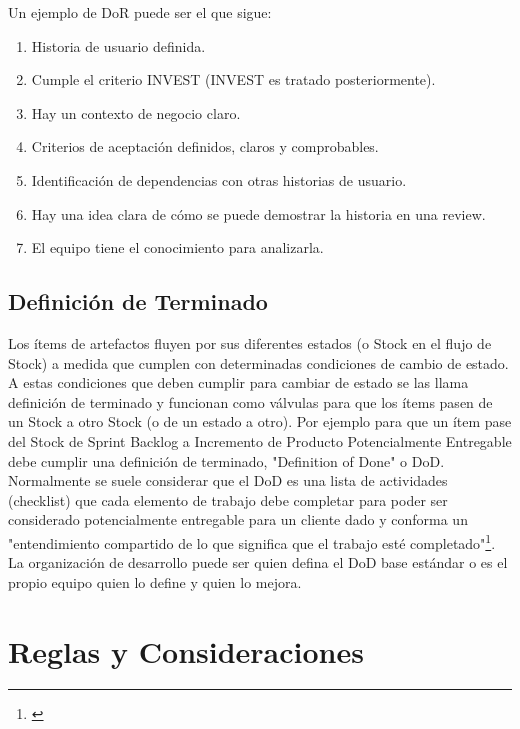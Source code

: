 Un ejemplo de DoR puede ser el que sigue:

\begin{enumerate}
\item{Historia de usuario definida.}
\item{Cumple el criterio INVEST (INVEST es tratado posteriormente).}
\item{Hay un contexto de negocio claro.}
\item{Criterios de aceptación definidos, claros y comprobables.}
\item{Identificación de dependencias con otras historias de usuario.}
\item{Hay una idea clara de cómo se puede demostrar la historia en una review.}
\item{El equipo tiene el conocimiento para analizarla.}
\end{enumerate}

\subsection{Definición de Terminado}

Los ítems de artefactos fluyen por sus diferentes estados (o Stock en el flujo de Stock) a medida que cumplen con determinadas condiciones de cambio de estado. A estas condiciones que deben cumplir para cambiar de estado se las llama definición de terminado y funcionan como válvulas para que los ítems pasen de un Stock a otro Stock (o de un estado a otro). Por ejemplo para que un ítem pase del Stock de Sprint Backlog a Incremento de Producto Potencialmente Entregable debe cumplir una definición de terminado, "Definition of Done" o DoD. Normalmente se suele considerar que el DoD es una lista de actividades (checklist) que cada elemento de trabajo debe completar para poder ser considerado potencialmente entregable para un cliente dado y conforma un "entendimiento compartido de lo que significa que el trabajo esté completado"\footnote{\cite{Ken-Jeff-2013}}. La organización de desarrollo puede ser quien defina el DoD base estándar o es el propio equipo quien lo define y quien lo mejora.

\section{Reglas y Consideraciones}

